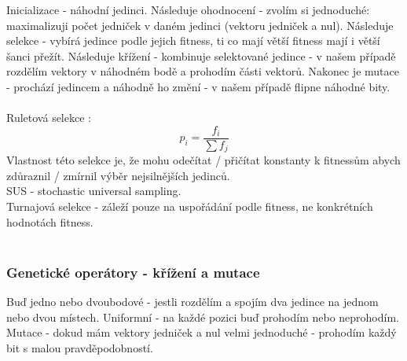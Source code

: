 \documentclass{article}
\begin{document}
Inicializace - náhodní jedinci. Následuje ohodnocení - zvolím si jednoduché: maximalizuji počet jedniček
v daném jedinci (vektoru jedniček a nul). Následuje selekce - vybírá jedince podle jejich fitness, ti co
mají větší fitness mají i větší šanci přežít. Následuje křížení - kombinuje selektované jedince - v našem
případě rozdělím vektory v náhodném bodě a prohodím části vektorů. Nakonec je mutace - prochází jedincem a
náhodně ho změní - v našem případě flipne náhodné bity.\\\\

Ruletová selekce : $$p_{i} = \frac{f_{i}}{\sum f_{j}}$$ Vlastnost této selekce je, že mohu odečítat / přičítat konstanty
k fitnessům abych zdůraznil / zmírnil výběr nejsilnějších jedinců.\\
SUS - stochastic universal sampling.\\
Turnajová selekce - záleží pouze na uspořádání podle fitness, ne konkrétních hodnotách fitness.\\\\

\subsubsection*{Genetické operátory - křížení a mutace}
Buď jedno nebo dvoubodové - jestli rozdělím a spojím dva jedince na jednom nebo dvou místech. Uniformní - na každé pozici
buď prohodím nebo neprohodím.\\
Mutace - dokud mám vektory jedniček a nul velmi jednoduché - prohodím každý bit s malou pravděpodobností.
\end{document}
